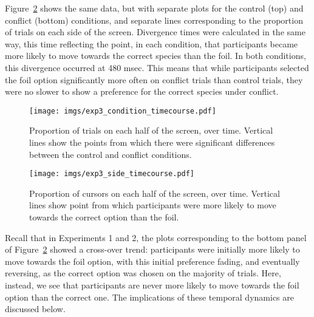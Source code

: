 Figure~\ref{fig:exp3_side_timecourse} shows the same data,
but with separate plots for the control (top) and conflict (bottom) conditions,
and separate lines corresponding to the proportion of trials
on each side of the screen.
Divergence times were calculated in the same way,
this time reflecting the point, in each condition,
that participants became more likely to move towards
the correct species than the foil.
In both conditions, this divergence occurred at 480 msec.
This means that while participants selected the foil option
significantly more often on conflict trials than control trials,
they were no slower to show a preference for the correct species under conflict.

\begin{figure}[tp]
  \centering
  \texttt{[image: imgs/exp3\_condition\_timecourse.pdf]}
  \caption[Time course, seperately for each condition, Experiment 3.]{
    Proportion of trials on each half of the screen, over time.
    Vertical lines show the points from which
    there were significant differences between
    the control and conflict conditions.
    \label{fig:exp3_condition_timecourse} }
\end{figure}

\begin{figure}[bp]
  \centering
  \texttt{[image: imgs/exp3\_side\_timecourse.pdf]}
  \caption[Time course, seperately for each response option, Experiment 3.]{
    Proportion of cursors on each half of the screen, over time.
    Vertical lines show point from which participants were
    more likely to move towards the correct option
    than the foil.
    \label{fig:exp3_side_timecourse} }
\end{figure}

Recall that in Experiments 1 and 2,
the plots corresponding to the bottom panel of Figure~\ref{fig:exp3_side_timecourse}
showed a cross-over trend:
participants were initially more likely to move towards the foil option,
with this initial preference fading, and eventually reversing,
as the correct option was chosen on the majority of trials.
Here, instead, we see that participants 
are never more likely to move towards the foil option than the correct one.
The implications of these temporal dynamics are discussed below.

